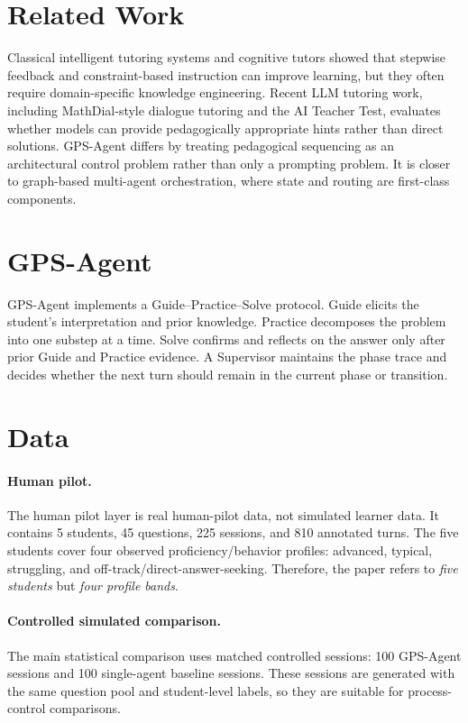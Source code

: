 \documentclass[11pt]{article}
\begin{document}
\section{Related Work}
Classical intelligent tutoring systems and cognitive tutors showed that stepwise feedback and constraint-based instruction can improve learning, but they often require domain-specific knowledge engineering. Recent LLM tutoring work, including MathDial-style dialogue tutoring and the AI Teacher Test, evaluates whether models can provide pedagogically appropriate hints rather than direct solutions. GPS-Agent differs by treating pedagogical sequencing as an architectural control problem rather than only a prompting problem. It is closer to graph-based multi-agent orchestration, where state and routing are first-class components.

\section{GPS-Agent}
GPS-Agent implements a Guide--Practice--Solve protocol. Guide elicits the student's interpretation and prior knowledge. Practice decomposes the problem into one substep at a time. Solve confirms and reflects on the answer only after prior Guide and Practice evidence. A Supervisor maintains the phase trace and decides whether the next turn should remain in the current phase or transition.

\section{Data}
\paragraph{Human pilot.} The human pilot layer is real human-pilot data, not simulated learner data. It contains 5 students, 45 questions, 225 sessions, and 810 annotated turns. The five students cover four observed proficiency/behavior profiles: advanced, typical, struggling, and off-track/direct-answer-seeking. Therefore, the paper refers to \emph{five students} but \emph{four profile bands}.

\paragraph{Controlled simulated comparison.} The main statistical comparison uses matched controlled sessions: 100 GPS-Agent sessions and 100 single-agent baseline sessions. These sessions are generated with the same question pool and student-level labels, so they are suitable for process-control comparisons.
\end{document}
